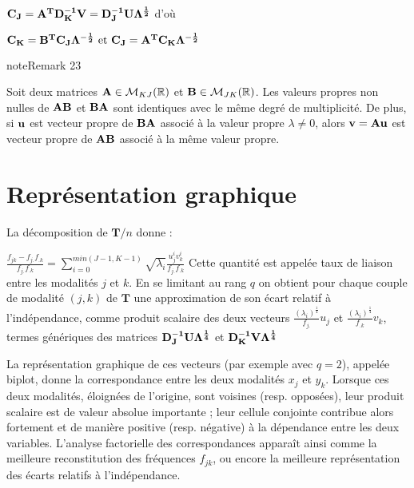 \documentclass[letterpaper,10pt,english]{jupyterBook}
\begin{document}
\sphinxAtStartPar
\({\bf C_J}={\bf A^TD_K^{-1}V}= {\bf D_J^{-1}U \Lambda^{\frac{1}{2}}}\)
d’où

\sphinxAtStartPar
\({\bf C_K}={\bf B^TC_J\Lambda^{-\frac{1}{2}}} \textrm{    et    } {\bf C_J}={\bf A^TC_K\Lambda^{-\frac{1}{2}}}\)
\label{afc:remark-0}
\begin{sphinxadmonition}{note}{Remark 23}



\sphinxAtStartPar
Soit deux matrices \({\bf A}\in\mathcal{M}_{KJ}(\mathbb{R)}\)  et \({\bf B}\in\mathcal{M}_{JK}(\mathbb{R})\). Les valeurs propres non nulles de \({\bf AB}\) et \({\bf BA}\) sont identiques avec le même degré de multiplicité. De plus, si \(\bf u\) est vecteur propre de \({\bf BA}\) associé à la valeur propre \(\lambda\neq 0\), alors \({\bf v} = {\bf Au} \) est vecteur propre de \({\bf AB}\) associé à la même valeur
propre.
\end{sphinxadmonition}


\section{Représentation graphique}
\label{\detokenize{afc:representation-graphique}}
\sphinxAtStartPar
La décomposition de \(\mathbf T/n\) donne :

\sphinxAtStartPar
\(\frac{f_{jk}-f_{j.}f_{.k}}{f_{j.}f_{.k}} = \displaystyle\sum_{i=0}^{min(J-1,K-1)}\sqrt{\lambda_i}\frac{u^i_jv^i_k}{f_{j.}f_{.k}}\)
Cette quantité est appelée taux de liaison entre les modalités \(j\) et \(k\). En se limitant au rang \(q\) on obtient pour chaque couple de modalité \((j,k)\) de \(\mathbf T\) une approximation de son écart relatif à l’indépendance, comme produit scalaire des deux vecteurs \(\frac{(\lambda_i)^{\frac{1}{4}}}{f_{j.}}u_j\) et \(\frac{(\lambda_i)^{\frac{1}{4}}}{f_{.k}}v_k\), termes génériques des matrices \({\bf D_J^{-1}U\Lambda^{\frac{1}{4}}}\) et \({\bf D_K^{-1}V\Lambda^{\frac{1}{4}}}\)

\sphinxAtStartPar
La représentation graphique de ces vecteurs (par exemple avec \(q=2\)), appelée biplot, donne la correspondance entre les deux modalités \(x_j\) et \(y_k\). Lorsque ces deux modalités, éloignées de l’origine, sont
voisines (resp. opposées), leur produit scalaire est de valeur absolue importante ; leur cellule conjointe contribue alors fortement et de manière positive
(resp. négative) à la dépendance entre les deux variables. L’analyse factorielle des correspondances apparaît ainsi comme la meilleure reconstitution des fréquences \(f_{jk}\), ou encore la meilleure représentation des écarts relatifs à l’indépendance.
\end{document}
